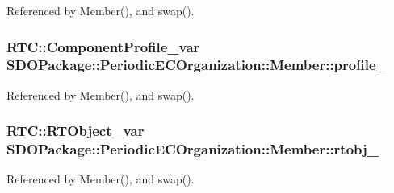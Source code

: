 Referenced by Member(), and swap().

\subsubsection[{profile\_\-}]{\setlength{\rightskip}{0pt plus 5cm}RTC::ComponentProfile\_\-var {\bf SDOPackage::PeriodicECOrganization::Member::profile\_\-}}\label{classSDOPackage_1_1PeriodicECOrganization_1_1Member_a873b545899d1f01929d6d717db99c2b2}


Referenced by Member(), and swap().

\subsubsection[{rtobj\_\-}]{\setlength{\rightskip}{0pt plus 5cm}RTC::RTObject\_\-var {\bf SDOPackage::PeriodicECOrganization::Member::rtobj\_\-}}\label{classSDOPackage_1_1PeriodicECOrganization_1_1Member_aa58c5763763724d04db9270935af6e9e}


Referenced by Member(), and swap().

